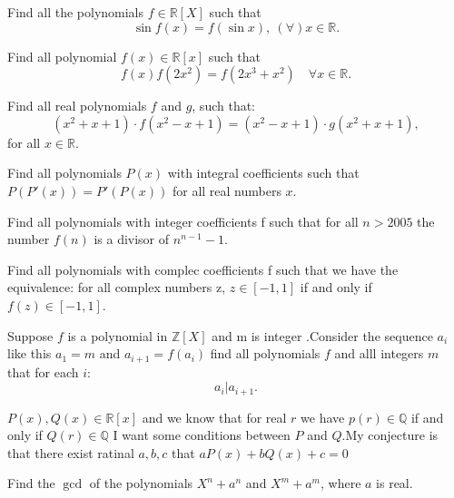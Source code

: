 \begin{question}
Find all the polynomials $f\in \mathbb{R}[X]$ such that
\[\sin f(x)=f(\sin x),\ (\forall)x\in \mathbb{R}.\]
\end{question}


\begin{question}
Find all polynomial $f(x) \in \mathbb{R}[x] $ such that 
\[f(x)f(2x^2)=f(2x^3+x^2) \quad \forall  x\in \mathbb{R}.\]
\end{question}


\begin{question}
Find all real polynomials $f$ and $g$, such that:
\[(x^2+x+1)\cdot f(x^2-x+1)=(x^2-x+1)\cdot g(x^2+x+1), \]
for all $x\in\mathbb{R}$.
\end{question}


\begin{question}
Find all polynomials $P(x)$ with integral coefficients such that $P(P'(x))=P'(P(x))$ for all real numbers $x$.
\end{question}


\begin{question}
Find all polynomials with integer coefficients f such that for all $n>2005$ the number $ f(n)$ is a divisor of $ n^{n-1}-1$.
\end{question}


\begin{question}
Find all polynomials with complec coefficients f such that we have the equivalence: for all complex numbers z, $ z\in[-1,1]$ if and only if $ f(z)\in [-1,1]$.
\end{question}


\begin{question}
Suppose $f$ is a polynomial in $\mathbb{Z}[X]$ and m is integer .Consider the sequence $a_i$ like this $a_1=m$ and $a_{i+1}=f(a_i)$ find all polynomials $f$ and alll integers $m$ that for each $i$:
\[ a_i | a_{i+1}.\]
\end{question}


\begin{question}
$P(x),Q(x) \in \mathbb{R}[x]$ and we know that for real $r$ we have $p(r) \in \mathbb{Q}$ if and only if $Q(r) \in \mathbb{Q}$
I want some conditions between $P$ and $Q$.My conjecture is that there exist ratinal $a,b,c$ that $aP(x)+bQ(x)+c=0$
\end{question}


\begin{question}
Find the $\gcd$ of the polynomials $X^n+a^n$ and $X^m+a^m$, where $a$ is real.
\end{question}


